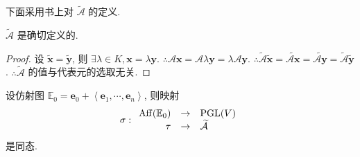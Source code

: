 \documentclass[color=black,device=normal,lang=cn,mode=geye]{elegantnote}
\begin{document}
下面采用书上对 $\widetilde{\mathcal{A}}$ 的定义.
\begin{theorem}
    $\widetilde{\mathcal{A}}$ 是确切定义的.
\end{theorem}
\begin{proof}
    设 $\tilde{\boldsymbol{x}}=\tilde{\boldsymbol{y}}$, 则 $\exists\lambda\in K,\boldsymbol{x}=\lambda\boldsymbol{y}$. $\therefore\mathcal{A}\boldsymbol{x}=\mathcal{A}\lambda\boldsymbol{y}=\lambda\mathcal{A}\boldsymbol{y}$. $\therefore\widetilde{\mathcal{A}}\tilde{\boldsymbol{x}}=\widetilde{\mathcal{A}\boldsymbol{x}}=\widetilde{\mathcal{A}\boldsymbol{y}}=\widetilde{\mathcal{A}}\tilde{\boldsymbol{y}}$. $\therefore\widetilde{\mathcal{A}}$ 的值与代表元的选取无关.
\end{proof}
\begin{theorem}
    设仿射图 $\mathbb{E}_0=\boldsymbol{e}_0+\left<\boldsymbol{e}_1,\cdots,\boldsymbol{e}_n\right>$, 则映射
    \[\sigma:\begin{array}{rcl}
        \operatorname{Aff} (\mathbb{E}_0) & \to & \operatorname{PGL} (V) \\
        \tau & \to & \widetilde{\mathcal{A}} \\
    \end{array}\]
    是同态.
\end{theorem}
\end{document}

